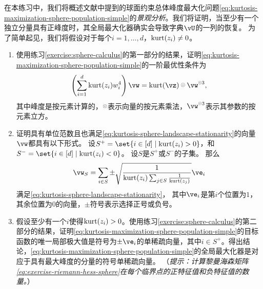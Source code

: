 \documentclass[../../book-main.tex]{subfiles}
\begin{document}
\begin{exercise}\label{exercise:kurtosis-sphere-landscape}
    在本练习中，我们将概述文献中提到的球面约束总体峰度最大化问题\eqref{eq:kurtosis-maximization-sphere-population-simple}的\textit{景观分析}。我们将证明，当至少有一个独立分量具有正峰度时，其全局最大化器确实会导致字典$\vU$的一列的恢复。
    为了简单起见，我们将假设对于每个$i = 1, \dots, d$，$\mathop{\mathrm{kurt}}(z_i) \neq 0$。
    \begin{enumerate}
        \item 使用练习\ref{exercise:sphere-calculus}的第一部分的结果，证明\eqref{eq:kurtosis-maximization-sphere-population-simple}的一阶最优性条件为
        \begin{equation}\label{eq:kurtosis-sphere-landscape-stationarity}
            \left(\sum_{i=1}^d \kurt(z_i) w_i^4 \right) 
            \vw = \kurt(\vz) \hada \vw^{\hada 3}, 
        \end{equation}
        其中峰度是按元素计算的，$\hada$表示向量的按元素乘法，$\vw^{\hada 3}$表示其参数的按元素立方。
        \item 证明具有单位范数且也满足\eqref{eq:kurtosis-sphere-landscape-stationarity}的向量$\vw$都具有以下形式。
        设$S^+ = \set{i \in [d] \given \kurt(z_i) > 0}$，和
        $S^- = \set{i \in [d] \given \kurt(z_i) < 0}$。
        设$S$是$S^+$或$S^-$的子集。
        那么
        \begin{equation}\label{eq:kurtosis-sphere-landscape-cps}
            \vw_S = \sum_{i \in S} \pm \sqrt{\frac{1}{\kurt(z_i) \sum_{j \in S} \frac{1}{\kurt(z_j)}}} \ve_i
        \end{equation}
        满足\eqref{eq:kurtosis-sphere-landscape-stationarity}，
        其中$\ve_i$是第$i$个位置为$1$，其余位置为$0$的向量，$\pm$符号表示选择正号或负号。
        \item 假设至少有一个$i$使得$\mathop{\mathrm{kurt}}(z_i) > 0$。使用练习\ref{exercise:sphere-calculus}的第二部分的结果，证明\eqref{eq:kurtosis-maximization-sphere-population-simple}的目标函数的唯一局部极大值是符号为$\pm \ve_i$的单稀疏向量，其中$i \in S^+$。得出结论，\eqref{eq:kurtosis-maximization-sphere-population-simple}的全局最大化器是对应于具有最大峰度的分量的符号单稀疏向量。%
        （\textit{提示：计算黎曼海森矩阵\eqref{eq:exercise-riemann-hess-sphere}在每个临界点的正特征值和负特征值的数量。}）

\end{enumerate}
\end{exercise}
\end{document}
